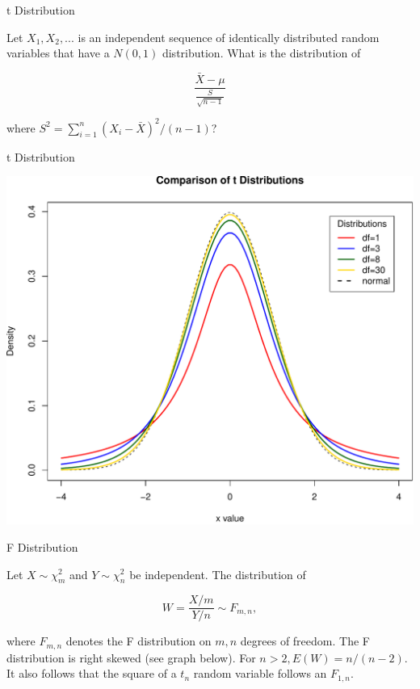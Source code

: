 \documentclass[9pt,ignorenonframetext,]{beamer}
\begin{document}
\begin{frame}{t Distribution}

Let \(X_1, X_2, ...\) is an independent sequence of identically
distributed random variables that have a \(N(0,1)\) distribution. What
is the distribution of

\[ \frac{{\bar X}-\mu }{\frac {S}{\sqrt {n-1}}}\]

where \(S^2=\sum_{i=1}^{n}(X_i-{\bar X})^2/(n-1)\)?

\end{frame}

\begin{frame}{t Distribution}

\includegraphics{class2-jan11_files/figure-beamer/unnamed-chunk-12-1.pdf}

\end{frame}

\begin{frame}{F Distribution}

Let \(X \sim \chi^2_m\) and \(Y\sim \chi^2_n\) be independent. The
distribution of

\[ W= \frac{X/m}{Y/n} \sim F_{m,n},\]

where \(F_{m,n}\) denotes the F distribution on \(m,n\) degrees of
freedom. The F distribution is right skewed (see graph below). For
\(n>2, E(W)=n/(n-2)\). It also follows that the square of a \(t_n\)
random variable follows an \(F_{1,n}\).

\end{frame}
\end{document}
